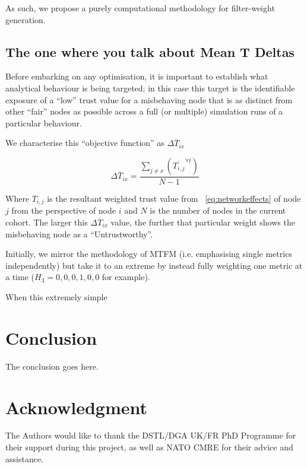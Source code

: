 \documentclass[conference]{IEEEtran}
\begin{document}
As such, we propose a purely computational methodology for filter-weight generation.

\subsection{The one where you talk about Mean T Deltas}

Before embarking on any optimisation, it is important to establish what analytical behaviour is being targeted; in this case this target is the identifiable exposure of a ``low'' trust value for a misbehaving node that is as distinct from other ``fair'' nodes as possible across a full (or multiple) simulation runs of a particular behaviour.

We characterise this ``objective function'' as $\Delta\overline T_{ix}$

\begin{equation}
  \Delta \overline T_{ix} = \frac{\sum_{j\neq x}\left( \overline{T_{i,j}}^{\forall t}\right)}{N-1} \label{eq:delta_t}
\end{equation}

Where $T_{i,j}$ is the resultant weighted trust value from ~\ref{eq:networkeffects} of node $j$ from the perspective of node $i$ and $N$ is the number of nodes in the current cohort.
The larger this $\Delta\overline T_{ix}$ value, the further that particular weight shows the misbehaving node as a ``Untrustworthy''.

Initially, we mirror the methodology of MTFM (i.e. emphasising single metrics independently) but take it to an extreme by instead fully weighting one metric at a time ($H_3 = {0,0,0,1,0,0}$ for example). 

When this extremely simple 



\section{Conclusion}
The conclusion goes here.






\section*{Acknowledgment}


The Authors would like to thank the DSTL/DGA UK/FR PhD Programme for their support during this project, as well as NATO CMRE for their advice and assistance.




\end{document}
